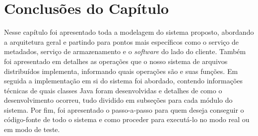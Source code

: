 \section{Conclusões do Capítulo}

Nesse capítulo foi apresentado toda a modelagem do sistema proposto, abordando a arquitetura geral e partindo para pontos mais específicos como o serviço de metadados, serviço de armazenamento e o \textit{software} do lado do cliente. Também foi apresentado em detalhes as operações que o nosso sistema de arquivos distribuídos implementa, informando quais operações são e suas funções. Em seguida a implementação em si do sistema foi abordado, contendo informações técnicas de quais classes Java foram desenvolvidas e detalhes de como o desenvolvimento ocorreu, tudo dividido em subseções para cada módulo do sistema. Por fim, foi apresentado o passo-a-passo para quem deseja conseguir o código-fonte de todo o sistema e como proceder para executá-lo no modo real ou em modo de teste.
\\
